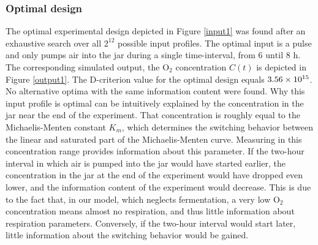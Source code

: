 \subsubsection{Optimal design}
The optimal experimental design depicted in Figure \ref{input1} was found after an exhaustive search over all $2^{12}$ possible input profiles. The optimal input is a pulse and only pumps air into the jar during a single time-interval, from $6 \text{ until } 8 \text{ h}$. The corresponding simulated output, the $\text{O}_2$ concentration $C(t)$ is depicted in Figure \ref{output1}. The D-criterion value for the optimal design equals $3.56\times 10^{15}$. No alternative optima with the same information content were found. Why this input profile is optimal can be intuitively explained by the concentration in the jar near the end of the experiment. That concentration is roughly equal to the Michaelis-Menten constant $K_m$, which determines the switching behavior between the linear and saturated part of the Michaelis-Menten curve. Measuring in this concentration range provides information about this parameter. If the two-hour interval in which air is pumped into the jar would have started earlier, the concentration in the jar at the end of the experiment would have dropped even lower, and the information content of the experiment would decrease. This is due to the fact that, in our model, which neglects fermentation, a very low $\text{O}_2$ concentration means almost no respiration, and thus little information about respiration parameters. Conversely, if the two-hour interval would start later, little information about the switching behavior would be gained.
